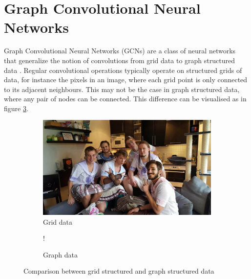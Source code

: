 


\section{Graph Convolutional Neural Networks}
\label{sec:gcn}

Graph Convolutional Neural Networks (GCNs) are a class of neural networks that generalize the notion of convolutions from grid data to graph structured data \cite{wu_review}. Regular convolutional operations typically operate on structured grids of data, for instance the pixels in an image, where each grid point is only connected to its adjacent neighbours. This may not be the case in graph structured data, where any pair of nodes can be connected. This difference can be visualised as in figure \ref{fig:grid_graph_data}. 

\begin{figure}
    \centering
        \begin{subfigure}{.5\textwidth}
            \centering
            \includegraphics[width=.9\linewidth]{chapters/images_theory/placeholder.jpg}
            \caption{Grid data}
            \label{fig:grid_data}
        \end{subfigure}%
        \begin{subfigure}{.5\textwidth}
            \begin{center}
                 {!} {
                    
                }
            \end{center}
            \caption{Graph data}
            \label{fig:graph_dad}
        \end{subfigure}
    \caption{Comparison between grid structured and graph structured data }
    \label{fig:grid_graph_data}
\end{figure}

